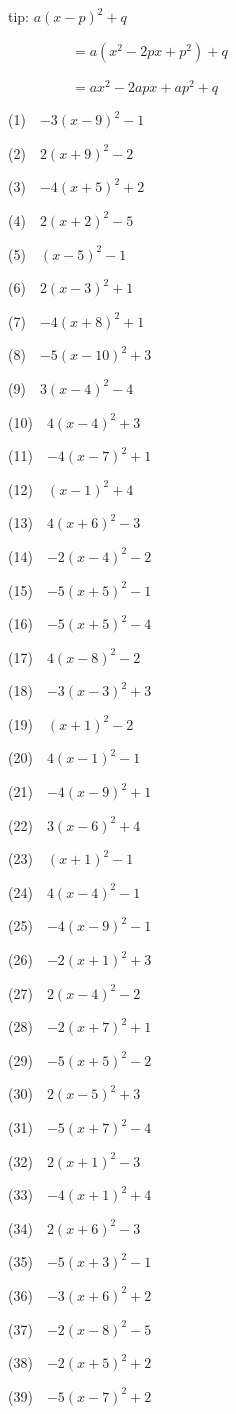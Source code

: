 \documentclass[a4j,twocolumn,10pt,fleqn]{jarticle}
\begin{document}
tip: $a(x - p)^2 + q$

~~~~~~~~~$= a(x^2 - 2px + p^2) + q$

~~~~~~~~~$= ax^2 - 2apx + ap^2 + q$

(1)~~$-3(x-9)^2-1$

(2)~~$2(x +9)^2-2$

(3)~~$-4(x +5)^2 +2$

(4)~~$2(x +2)^2-5$

(5)~~$(x-5)^2-1$

(6)~~$2(x-3)^2 +1$

(7)~~$-4(x +8)^2 +1$

(8)~~$-5(x-10)^2 +3$

(9)~~$3(x-4)^2-4$

(10)~~$4(x-4)^2 +3$

(11)~~$-4(x-7)^2 +1$

(12)~~$(x-1)^2 +4$

(13)~~$4(x +6)^2-3$

(14)~~$-2(x-4)^2-2$

(15)~~$-5(x +5)^2-1$

(16)~~$-5(x +5)^2-4$

(17)~~$4(x-8)^2-2$

(18)~~$-3(x-3)^2 +3$

(19)~~$(x +1)^2-2$

(20)~~$4(x-1)^2-1$

(21)~~$-4(x-9)^2 +1$

(22)~~$3(x-6)^2 +4$

(23)~~$(x +1)^2-1$

(24)~~$4(x-4)^2-1$

(25)~~$-4(x-9)^2-1$

(26)~~$-2(x +1)^2 +3$

(27)~~$2(x-4)^2-2$

(28)~~$-2(x +7)^2 +1$

(29)~~$-5(x +5)^2-2$

(30)~~$2(x-5)^2 +3$

(31)~~$-5(x +7)^2-4$

(32)~~$2(x +1)^2-3$

(33)~~$-4(x +1)^2 +4$

(34)~~$2(x +6)^2-3$

(35)~~$-5(x +3)^2-1$

(36)~~$-3(x +6)^2 +2$

(37)~~$-2(x-8)^2-5$

(38)~~$-2(x +5)^2 +2$

(39)~~$-5(x-7)^2 +2$
\end{document}
